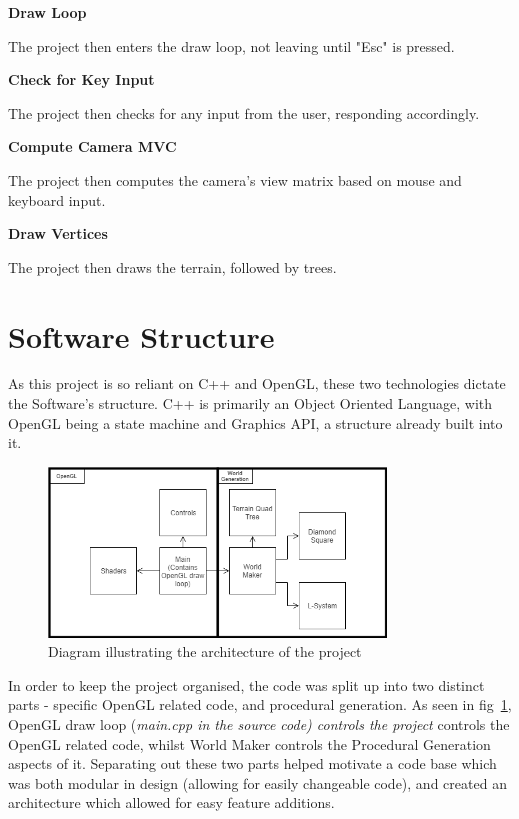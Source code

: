 \documentclass[a4paper,10pt]{report}
\begin{document}
\textbf{Draw Loop} \par
The project then enters the draw loop, not leaving until "Esc" is pressed. \medskip

\textbf{Check for Key Input} \par 
The project then checks for any input from the user, responding accordingly. \medskip

\textbf{Compute Camera MVC} \par 
The project then computes the camera's view matrix based on mouse and keyboard input. \medskip

\textbf{Draw Vertices} \par 
The project then draws the terrain, followed by trees. \medskip

\section{Software Structure}
As this project is so reliant on C++ and OpenGL, these two technologies dictate the Software's structure. C++ is primarily an Object Oriented Language, with OpenGL being a state machine and Graphics API, a structure already built into it. \\

\begin{figure}[h!]
    \centering
\includegraphics[width=0.8\textwidth]{Architecture.png} 
\caption{Diagram illustrating the architecture of the project}
\label{architecture}
\end{figure} 

In order to keep the project organised, the code was split up into two distinct parts - specific OpenGL related code, and procedural generation. As seen in fig~\ref{architecture}, OpenGL draw loop (\textit{main.cpp in the source code) controls the project} controls the OpenGL related code, whilst World Maker controls the Procedural Generation aspects of it. Separating out these two parts helped motivate a code base which was both modular in design (allowing for easily changeable code), and created an architecture which allowed for easy feature additions. \\
\end{document}

